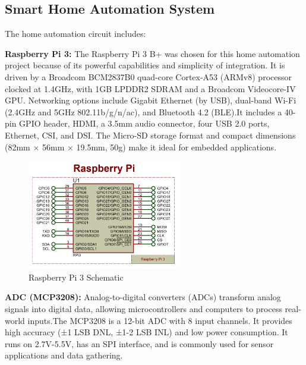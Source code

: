 \documentclass[a4paper,12pt]{report}
\begin{document}
\subsection{Smart Home Automation System}
The home automation circuit includes:

\textbf{Raspberry Pi 3:} The Raspberry Pi 3 B+ was chosen for this home automation project because of its powerful capabilities and simplicity of integration.  It is driven by a Broadcom BCM2837B0 quad-core Cortex-A53 (ARMv8) processor clocked at 1.4GHz, with 1GB LPDDR2 SDRAM and a Broadcom Videocore-IV GPU. Networking options include Gigabit Ethernet (by USB), dual-band Wi-Fi (2.4GHz and 5GHz 802.11b/g/n/ac), and Bluetooth 4.2 (BLE)\cite{valov2020home}.It includes a 40-pin GPIO header, HDMI, a 3.5mm audio connector, four USB 2.0 ports, Ethernet, CSI, and DSI.  The Micro-SD storage format and compact dimensions (82mm × 56mm × 19.5mm, 50g) make it ideal for embedded applications\cite{valov2020home}.

\begin{figure}[H]  %
    \centering
    \includegraphics[width=0.6\textwidth]{image.png} %
    \caption{Raspberry Pi 3 Schematic}
    \label{fig:Raspberry} %
\end{figure}


\textbf{ADC (MCP3208):} Analog-to-digital converters (ADCs) transform analog signals into digital data, allowing microcontrollers and computers to process real-world inputs.The MCP3208 is a 12-bit ADC with 8 input channels. It provides high accuracy (±1 LSB DNL, ±1-2 LSB INL) and low power consumption.  It runs on 2.7V-5.5V, has an SPI interface, and is commonly used for sensor applications and data gathering\cite{Dout199927V41}.
\end{document}
